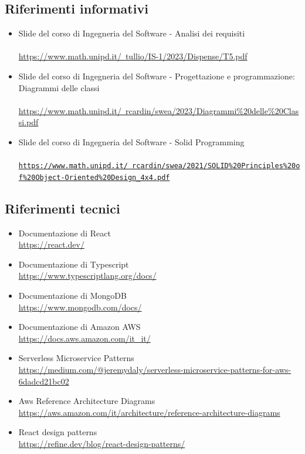 \documentclass{article}
\begin{document}
{\subsection{Riferimenti informativi}
\begin{itemize}
    \item Slide del corso di Ingegneria del Software - Analisi dei requisiti \\ \\
    \href{https://www.math.unipd.it/~tullio/IS-1/2023/Dispense/T5.pdf}{https://www.math.unipd.it/~tullio/IS-1/2023/Dispense/T5.pdf}
    \item Slide del corso di Ingegneria del Software - Progettazione e programmazione: Diagrammi delle classi \\ \\
\href{https://www.math.unipd.it/~rcardin/swea/2023/Diagrammi%20delle%20Classi.pdf}{https://www.math.unipd.it/~rcardin/swea/2023/Diagrammi\%20delle\%20Classi.pdf}
    \item Slide del corso di Ingegneria del Software - Solid Programming \\ \\
\href{https://www.math.unipd.it/~rcardin/swea/2021/SOLID\%20Principles\%20of\%20Object-Oriented\%20Design_4x4.pdf}{\texttt{https://www.math.unipd.it/~rcardin/swea/2021/SOLID\%20Principles\%20of\%20Object-Oriented\%20Design\_4x4.pdf}}
\end{itemize}
\subsection{Riferimenti tecnici}
\begin{itemize}
\item Documentazione di React \\ \href{ https://react.dev/}{ https://react.dev/}
\item Documentazione di Typescript \\ \href{https://www.typescriptlang.org/docs/}{https://www.typescriptlang.org/docs/}
\item Documentazione di MongoDB \\ \href{https://www.mongodb.com/docs/}{https://www.mongodb.com/docs/}
\item Documentazione di Amazon AWS \\ \href{https://docs.aws.amazon.com/it_it/}{https://docs.aws.amazon.com/it\_it/}
\item Serverless Microservice Patterns \\\href{https://medium.com/@jeremydaly/serverless-microservice-patterns-for-aws-6dadcd21bc02}{https://medium.com/@jeremydaly/serverless-microservice-patterns-for-aws-6dadcd21bc02}
\item Aws Reference Architecture Diagrams \\ \href{https://aws.amazon.com/it/architecture/reference-architecture-diagrams}{https://aws.amazon.com/it/architecture/reference-architecture-diagrams}
\item React design patterns \\ \href{https://refine.dev/blog/react-design-patterns/}{https://refine.dev/blog/react-design-patterns/}
\end{itemize}

}
\end{document}
